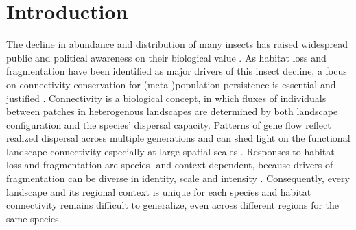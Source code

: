 \documentclass[10pt, twoside]{book} %
\begin{document}
	\section{Introduction}
	The decline in abundance and distribution of many insects has raised widespread public and political awareness on their biological value \citep{harvey2020, didham2020, wagner2021, welti2021}. As habitat loss and fragmentation have been identified as major drivers of this insect decline, a focus on connectivity conservation for (meta-)population persistence is essential and justified \citep{hanski1996, hanski2002, haddad2015, cardoso2020}. Connectivity is a biological concept, in which fluxes of individuals between patches in heterogenous landscapes are determined by both landscape configuration and the species' dispersal capacity. Patterns of gene flow reflect realized dispersal across multiple generations and can shed light on the functional landscape connectivity especially at large spatial scales \citep{kim2013, hodgson2022, maes2022}. Responses to habitat loss and fragmentation are species- and context-dependent, because drivers of fragmentation can be diverse in identity, scale and intensity \citep{cheptou2017}. Consequently, every landscape and its regional context is unique for each species and habitat connectivity remains difficult to generalize, even across different regions for the same species. \\
	
\end{document}
